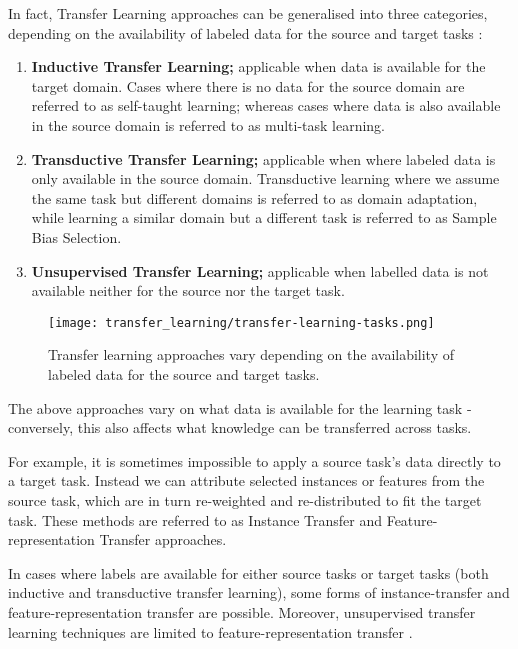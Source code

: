 In fact, Transfer Learning approaches can be generalised into three categories, depending on the availability of labeled data for the source and target tasks \citep{panyang2010}:
\begin{enumerate}  
\item \textbf{Inductive Transfer Learning;} applicable when data is available for the target domain. Cases where there is no data for the source domain are referred to as self-taught learning; whereas cases where data is also available in the source domain is referred to as multi-task learning.




\item \textbf{Transductive Transfer Learning;} applicable when where labeled data is only available in the source domain. Transductive learning where we assume the same task but different domains is referred to as domain adaptation, while learning a similar domain but a different task is referred to as Sample Bias Selection.  

\item \textbf{Unsupervised Transfer Learning;} applicable when labelled data is not available neither for the source nor the target task.
\end{enumerate}

\begin{figure}
  \texttt{[image: transfer\_learning/transfer-learning-tasks.png]}
  \caption{Transfer learning approaches vary  depending on the availability of labeled data for the source and target tasks.}
  \label{fig:transferlearning_models}
\end{figure}

The above approaches vary on what data is available for the learning task - conversely, this also affects what knowledge can be transferred across tasks. 

For example, it is sometimes impossible to apply a source task's data directly to a target task. Instead we can attribute selected instances or features from the source task, which are in turn re-weighted and re-distributed to fit the target task. These methods are referred to as Instance Transfer and Feature-representation Transfer approaches.

In cases where labels are available for either source tasks or target tasks (both inductive and transductive transfer learning), some forms of instance-transfer and feature-representation transfer are possible. Moreover, unsupervised transfer learning techniques are limited to feature-representation transfer \citep{panyang2010}. 

